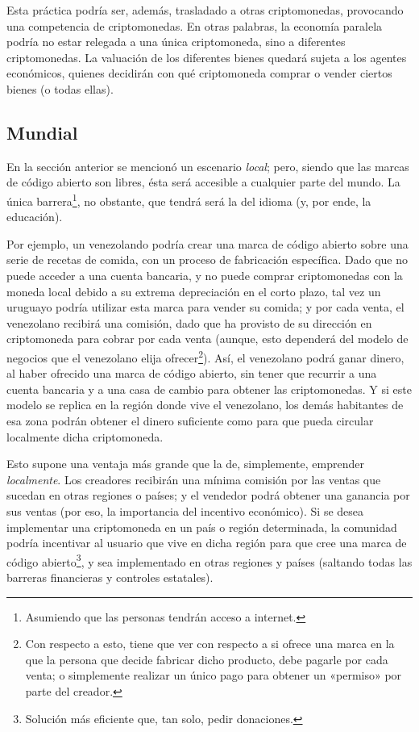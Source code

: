 \documentclass[12pt,a4paper]{article}
\begin{document}
Esta práctica podría ser, además, trasladado a otras criptomonedas, provocando una competencia de criptomonedas. En otras palabras, la economía paralela podría no estar relegada a una única criptomoneda, sino a diferentes criptomonedas. La valuación de los diferentes bienes quedará sujeta a los agentes económicos, quienes decidirán con qué criptomoneda comprar o vender ciertos bienes (o todas ellas).

\subsection{Mundial}
En la sección anterior se mencionó un escenario \textit{local}; pero, siendo que las marcas de código abierto son libres, ésta será accesible a cualquier parte del mundo. La única barrera\footnote{Asumiendo que las personas tendrán acceso a internet.}, no obstante, que tendrá será la del idioma (y, por ende, la educación).

Por ejemplo, un venezolando podría crear una marca de código abierto sobre una serie de recetas de comida, con un proceso de fabricación específica. Dado que no puede acceder a una cuenta bancaria, y no puede comprar criptomonedas con la moneda local debido a su extrema depreciación en el corto plazo, tal vez un uruguayo podría utilizar esta marca para vender su comida; y por cada venta, el venezolano recibirá una comisión, dado que ha provisto de su dirección en criptomoneda para cobrar por cada venta (aunque, esto dependerá del modelo de negocios que el venezolano elija ofrecer\footnote{Con respecto a esto, tiene que ver con respecto a si ofrece una marca en la que la persona que decide fabricar dicho producto, debe pagarle por cada venta; o simplemente realizar un único pago para obtener un «permiso» por parte del creador.}). Así, el venezolano podrá ganar dinero, al haber ofrecido una marca de código abierto, sin tener que recurrir a una cuenta bancaria y a una casa de cambio para obtener las criptomonedas. Y si este modelo se replica en la región donde vive el venezolano, los demás habitantes de esa zona podrán obtener el dinero suficiente como para que pueda circular localmente dicha criptomoneda.

Esto supone una ventaja más grande que la de, simplemente, emprender \textit{localmente}. Los creadores recibirán una mínima comisión por las ventas que sucedan en otras regiones o países; y el vendedor podrá obtener una ganancia por sus ventas (por eso, la importancia del incentivo económico). Si se desea implementar una criptomoneda en un país o región determinada, la comunidad podría incentivar al usuario que vive en dicha región para que cree una marca de código abierto\footnote{Solución más eficiente que, tan solo, pedir donaciones.}, y sea implementado en otras regiones y países (saltando todas las barreras financieras y controles estatales).
\end{document}
